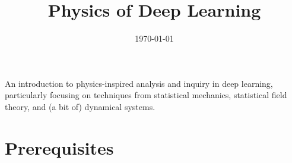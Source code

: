 \documentclass[11pt]{article}
\title{Physics of Deep Learning}
\author{\authorname{Aleksander Czejdo} \hspace{.7in} %
\and \authorname{Tudor Dimofte} %
\and \hspace{.2in}\authorname{Brianna Grado-White}\hspace{.3in}  %
\and \authorname{Charles Renshaw-Whitman} %
}
\date{\today}
\begin{document}
\maketitle

\begin{summary}
An introduction to physics-inspired analysis and
inquiry in deep learning, particularly focusing on techniques from statistical mechanics,
statistical field theory, and (a bit of) dynamical systems.



\end{summary}



\newpage
{\small\tableofcontents}

\setcounter{section}{-2}
\section{Prerequisites}
\label{sec:prereqs}
\end{document}
